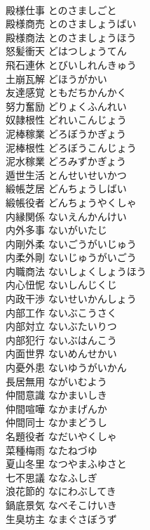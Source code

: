 \documentclass[8pt]{extreport}
\begin{document}
\begin{CJK}{UTF8}{min}
\\	殿様仕事	とのさましごと	
\\	殿様商売	とのさましょうばい	
\\	殿様商法	とのさましょうほう	
\\	怒髪衝天	どはつしょうてん	
\\	飛石連休	とびいしれんきゅう	
\\	土崩瓦解	どほうがかい	
\\	友達感覚	ともだちかんかく	
\\	努力奮励	どりょくふんれい	
\\	奴隷根性	どれいこんじょう	
\\	泥棒稼業	どろぼうかぎょう	
\\	泥棒根性	どろぼうこんじょう	
\\	泥水稼業	どろみずかぎょう	
\\	遁世生活	とんせいせいかつ	
\\	緞帳芝居	どんちょうしばい	
\\	緞帳役者	どんちょうやくしゃ	
\\	内縁関係	ないえんかんけい	
\\	内外多事	ないがいたじ	
\\	内剛外柔	ないごうがいじゅう	
\\	内柔外剛	ないじゅうがいごう	
\\	内職商法	ないしょくしょうほう	
\\	内心忸怩	ないしんじくじ	
\\	内政干渉	ないせいかんしょう	
\\	内部工作	ないぶこうさく	
\\	内部対立	ないぶたいりつ	
\\	内部犯行	ないぶはんこう	
\\	内面世界	ないめんせかい	
\\	内憂外患	ないゆうがいかん	
\\	長居無用	ながいむよう	
\\	仲間意識	なかまいしき	
\\	仲間喧嘩	なかまげんか	
\\	仲間同士	なかまどうし	
\\	名題役者	なだいやくしゃ	
\\	菜種梅雨	なたねづゆ	
\\	夏山冬里	なつやまふゆさと	
\\	七不思議	ななふしぎ	
\\	浪花節的	なにわぶしてき	
\\	鍋底景気	なべそこけいき	
\\	生臭坊主	なまぐさぼうず	

\end{CJK}
\end{document}
